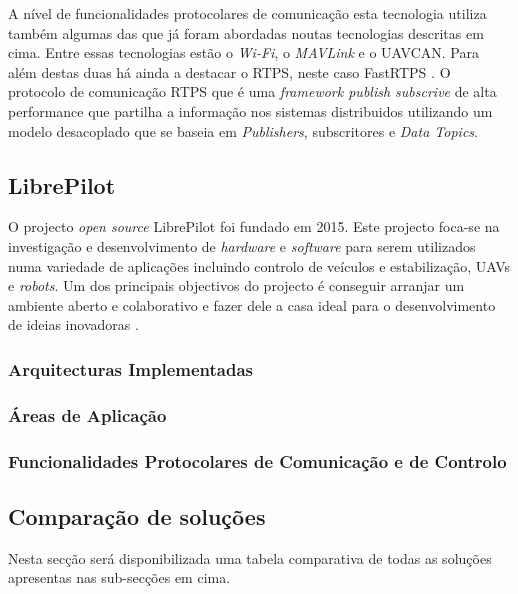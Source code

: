 A nível de funcionalidades protocolares de comunicação esta tecnologia utiliza também algumas das que já foram abordadas noutas tecnologias descritas em cima. Entre essas tecnologias estão o \textit{Wi-Fi}, o \textit{MAVLink} e o UAVCAN. Para além destas duas há ainda a destacar o RTPS, neste caso FastRTPS \cite{DronecodeProject}. O protocolo de comunicação RTPS que é uma \textit{framework publish subscrive} de alta performance que partilha a informação nos sistemas distribuidos utilizando um modelo desacoplado que se baseia em \textit{Publishers}, subscritores e \textit{Data Topics}\cite{EProsima}.

\subsection{LibrePilot}

O projecto \textit{open source} LibrePilot foi fundado em 2015. Este projecto foca-se na investigação e desenvolvimento de \textit{hardware} e \textit{software} para serem utilizados numa variedade de aplicações incluindo controlo de veículos e estabilização, UAVs e \textit{robots}. Um dos principais objectivos do projecto é conseguir arranjar um ambiente aberto e colaborativo e fazer dele a casa ideal para o desenvolvimento de ideias inovadoras \cite{LibrePilot}.

\subsubsection{Arquitecturas Implementadas}



\subsubsection{Áreas de Aplicação}

\subsubsection{Funcionalidades Protocolares de Comunicação e de Controlo}

\subsection{Comparação de soluções}

Nesta secção será disponibilizada uma tabela comparativa de todas as soluções apresentas nas sub-secções em cima.


